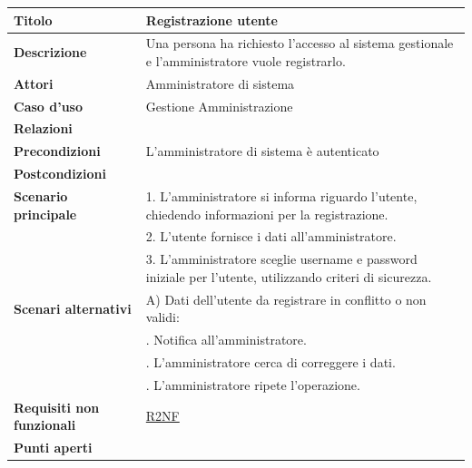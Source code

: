 \documentclass[a4paper]{article}
\begin{document}


\begin{center}
\begin{tabularx}{1\textwidth}{|l|X|}
    \hline
	\textbf{Titolo} & Registrazione utente \\
	\hline
	\textbf{Descrizione} & Una persona ha richiesto l'accesso al sistema gestionale e l'amministratore vuole registrarlo. \\
	\hline
	\textbf{Attori} & Amministratore di sistema \\
	\hline
	\textbf{Caso d'uso} & Gestione Amministrazione \\
	\hline
	\textbf{Relazioni} &  \\
	\hline
	\textbf{Precondizioni} & L'amministratore di sistema è autenticato \\
	\hline
	\textbf{Postcondizioni} &  \\
	\hline
	\textbf{Scenario principale} & 1. L'amministratore si informa riguardo l'utente, chiedendo informazioni per la registrazione.\\
								 & 2. L'utente fornisce i dati all'amministratore.\\
								 & 3. L'amministratore sceglie username e password iniziale per l'utente, utilizzando criteri di sicurezza.\\
	\hline
	\textbf{Scenari alternativi} & A) Dati dell'utente da registrare in conflitto o non validi: \\
								 & \quad 1. Notifica all'amministratore.\\
								 & \quad 2. L'amministratore cerca di correggere i dati.\\
								 & \quad 3. L'amministratore ripete l'operazione.\\
	\hline
	\textbf{Requisiti non funzionali} & \hyperlink{R2NF}{R2NF} \\
	\hline
	\textbf{Punti aperti} & \\
	\hline
\end{tabularx}
\end{center}




\end{document}

